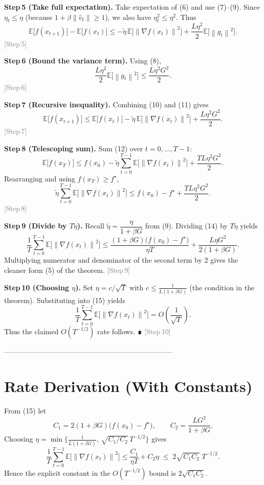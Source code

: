 \documentclass{article}
\newcommand{\E}{\mathbb{E}}
\newcommand{\norm}[1]{\left\|#1\right\|}
\newcommand{\grad}{\nabla}
\begin{document}
\noindent\textbf{Step 5 (Take full expectation).}  
Take expectation of (6) and use (7)–(9). Since $\eta_{t}\le\eta$ (because $1+\beta\norm{\hat v_{t}}\ge1$), we also have $\eta_{t}^{2}\le\eta^{2}$. Thus
\[
\E\!\bigl[f(x_{t+1})\bigr]-\E\!\bigl[f(x_{t})\bigr]
\le -\tilde\eta\,\E\!\bigl[\norm{\grad f(x_{t})}^{2}\bigr]
   +\frac{L\eta^{2}}{2}\E\!\bigl[\norm{g_{t}}^{2}\bigr].
\tag{10}
\]
\textcolor{gray}{[Step 5]}

\noindent\textbf{Step 6 (Bound the variance term).}  
Using (8),
\[
\frac{L\eta^{2}}{2}\E\!\bigl[\norm{g_{t}}^{2}\bigr]
\le \frac{L\eta^{2}G^{2}}{2}.
\tag{11}
\]
\textcolor{gray}{[Step 6]}

\noindent\textbf{Step 7 (Recursive inequality).}  
Combining (10) and (11) gives
\[
\E\!\bigl[f(x_{t+1})\bigr]\le \E\!\bigl[f(x_{t})\bigr]
-\tilde\eta\,\E\!\bigl[\norm{\grad f(x_{t})}^{2}\bigr]
+\frac{L\eta^{2}G^{2}}{2}.
\tag{12}
\]
\textcolor{gray}{[Step 7]}

\noindent\textbf{Step 8 (Telescoping sum).}  
Sum (12) over $t=0,\dots,T-1$:
\[
\E\!\bigl[f(x_{T})\bigr]\le f(x_{0})
-\tilde\eta\sum_{t=0}^{T-1}\E\!\bigl[\norm{\grad f(x_{t})}^{2}\bigr]
+\frac{TL\eta^{2}G^{2}}{2}.
\tag{13}
\]
Rearranging and using $f(x_{T})\ge f^{\star}$,
\[
\tilde\eta\sum_{t=0}^{T-1}\E\!\bigl[\norm{\grad f(x_{t})}^{2}\bigr]
\le f(x_{0})-f^{\star}
+\frac{TL\eta^{2}G^{2}}{2}.
\tag{14}
\]
\textcolor{gray}{[Step 8]}

\noindent\textbf{Step 9 (Divide by $T\tilde\eta$).}  
Recall $\tilde\eta=\dfrac{\eta}{1+\beta G}$ from (9). Dividing (14) by $T\tilde\eta$ yields
\[
\frac{1}{T}\sum_{t=0}^{T-1}\E\!\bigl[\norm{\grad f(x_{t})}^{2}\bigr]
\le
\frac{(1+\beta G)\bigl(f(x_{0})-f^{\star}\bigr)}{\eta T}
+\frac{L\eta G^{2}}{2(1+\beta G)}.
\tag{15}
\]
Multiplying numerator and denominator of the second term by $2$ gives the cleaner form (5) of the theorem.
\textcolor{gray}{[Step 9]}

\noindent\textbf{Step 10 (Choosing $\eta$).}  
Set $\displaystyle\eta = c/\sqrt{T}$ with $c\le\frac{1}{L(1+\beta G)}$ (the condition in the theorem). Substituting into (15) yields
\[
\frac{1}{T}\sum_{t=0}^{T-1}\E\!\bigl[\norm{\grad f(x_{t})}^{2}\bigr]
= O\!\left(\frac{1}{\sqrt{T}}\right).
\tag{16}
\]
Thus the claimed $O(T^{-1/2})$ rate follows. ∎
\textcolor{gray}{[Step 10]}

-----------------------------------------------------------------------

\section*{Rate Derivation (With Constants)}
From (15) let
\[
C_{1}=2(1+\beta G)\bigl(f(x_{0})-f^{\star}\bigr),\qquad
C_{2}= \frac{L G^{2}}{1+\beta G}.
\]
Choosing $\eta = \min\!\bigl\{ \frac{1}{L(1+\beta G)},\,\sqrt{C_{1}/C_{2}}\,T^{-1/2}\bigr\}$ gives
\[
\frac{1}{T}\sum_{t=0}^{T-1}\E\!\bigl[\norm{\grad f(x_{t})}^{2}\bigr]
\le
\frac{C_{1}}{\eta T}+C_{2}\eta
\;\le\;
2\sqrt{C_{1}C_{2}}\;T^{-1/2}.
\]
Hence the explicit constant in the $O(T^{-1/2})$ bound is $2\sqrt{C_{1}C_{2}}$.
\end{document}
